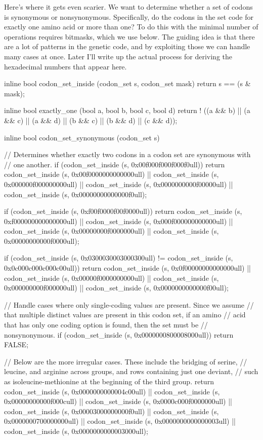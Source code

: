 \documentclass{article}
\begin{document}
      Here’s where it gets even scarier. We want to determine whether a set of
      codons is synonymous or nonsynonymous. Specifically, do the codons in the
      set code for exactly one amino acid or more than one? To do this with the
      minimal number of operations requires bitmasks, which we use below. The
      guiding idea is that there are a lot of patterns in the genetic code, and
      by exploiting those we can handle many cases at once. Later I’ll write up
      the actual process for deriving the hexadecimal numbers that appear here.

\begin{ccode}
inline bool codon_set_inside (codon_set s, codon_set mask)
  {return s == (s & mask);}

inline bool exactly_one (bool a, bool b, bool c, bool d) {
  return ! ((a && b) || (a && c) || (a && d) ||
          (b && c) || (b && d) || (c && d));
}

inline bool codon_set_synonymous (codon_set s) {
  // Determines whether exactly two codons in a codon set are synonymous with
  // one another.
  if (codon_set_inside (s, 0x00f000f000f000f0ull))
    return codon_set_inside (s, 0x00f0000000000000ull) ||
	   codon_set_inside (s, 0x000000f000000000ull) ||
	   codon_set_inside (s, 0x0000000000f00000ull) ||
	   codon_set_inside (s, 0x00000000000000f0ull);

  if (codon_set_inside (s, 0xf00f0000f00f0000ull))
    return codon_set_inside (s, 0xf000000000000000ull) ||
	   codon_set_inside (s, 0x000f000000000000ull) ||
	   codon_set_inside (s, 0x00000000f0000000ull) ||
	   codon_set_inside (s, 0x00000000000f0000ull);

  if (codon_set_inside (s, 0x0300030003000300ull) !=
      codon_set_inside (s, 0x0c000c000c000c00ull))
    return codon_set_inside (s, 0x0f00000000000000ull) ||
	   codon_set_inside (s, 0x00000f0000000000ull) ||
	   codon_set_inside (s, 0x000000000f000000ull) ||
	   codon_set_inside (s, 0x0000000000000f00ull);

  // Handle cases where only single-coding values are present. Since we assume
  // that multiple distinct values are present in this codon set, if an amino
  // acid that has only one coding option is found, then the set must be
  // nonsynonymous.
  if (codon_set_inside (s, 0x0000000800008000ull))
    return FALSE;

  // Below are the more irregular cases. These include the bridging of serine,
  // leucine, and arginine across groups, and rows containing just one deviant,
  // such as isoleucine-methionine at the beginning of the third group.
  return  codon_set_inside (s, 0x0000000000004c00ull) ||
	  codon_set_inside (s, 0x00000000000f000cull) ||
	  codon_set_inside (s, 0x0000c000f0000000ull) ||
	  codon_set_inside (s, 0x00003000000000f0ull) ||
	  codon_set_inside (s, 0x0000000700000000ull) ||
	  codon_set_inside (s, 0x0000000000000003ull) ||
	  codon_set_inside (s, 0x0000000000003000ull);
}
\end{ccode}
\end{document}
